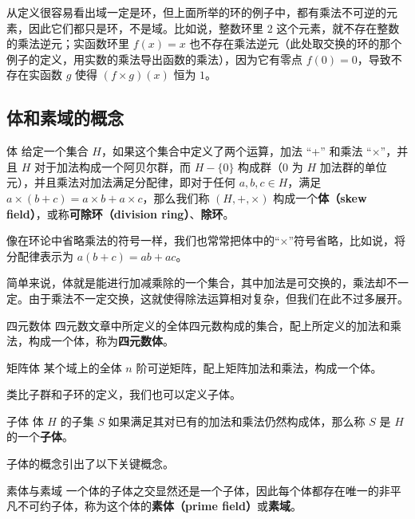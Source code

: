 从定义很容易看出域一定是环，但上面所举的环的例子中，都有乘法不可逆的元素，因此它们都只是环，不是域。比如说，整数环里 $2$ 这个元素，就不存在整数的乘法逆元；实函数环里 $f(x)=x$ 也不存在乘法逆元（此处取交换的环的那个例子的定义，用实数的乘法导出函数的乘法），因为它有零点 $f(0)=0$，导致不存在实函数 $g$ 使得 $(f\times g)(x)$ 恒为 $1$。




\subsection{体和素域的概念}

\begin{definition}{体}\label{def_field_1}
给定一个集合 $H$，如果这个集合中定义了两个运算，加法 “+” 和乘法 “$\times$”，并且 $H$ 对于加法构成一个阿贝尔群，而 $H-\{0\}$ 构成群（$0$ 为 $H$ 加法群的单位元），并且乘法对加法满足分配律，即对于任何 $a, b, c\in H$，满足 $a\times(b+c)=a\times b+a\times c$，那么我们称 $(H, +, \times)$ 构成一个\textbf{体（skew field）}，或称\textbf{可除环（division ring）}、\textbf{除环}。
\end{definition}

像在环论中省略乘法的符号一样，我们也常常把体中的“$\times$”符号省略，比如说，将分配律表示为 $a(b+c)=ab+ac$。

简单来说，体就是能进行加减乘除的一个集合，其中加法是可交换的，乘法却不一定。由于乘法不一定交换，这就使得除法运算相对复杂，但我们在此不过多展开。

\begin{example}{四元数体}
四元数文章中所定义的全体四元数构成的集合，配上所定义的加法和乘法，构成一个体，称为\textbf{四元数体}。
\end{example}

\begin{example}{矩阵体}
某个域上的全体 $n$ 阶可逆矩阵，配上矩阵加法和乘法，构成一个体。
\end{example}

类比子群和子环的定义，我们也可以定义子体。

\begin{definition}{子体}
体 $H$ 的子集 $S$ 如果满足其对已有的加法和乘法仍然构成体，那么称 $S$ 是 $H$ 的一个\textbf{子体}。
\end{definition}
子体的概念引出了以下关键概念。
\begin{definition}{素体与素域}
一个体的子体之交显然还是一个子体，因此每个体都存在唯一的非平凡不可约子体，称为这个体的\textbf{素体（prime field）}或\textbf{素域}。
\end{definition}

